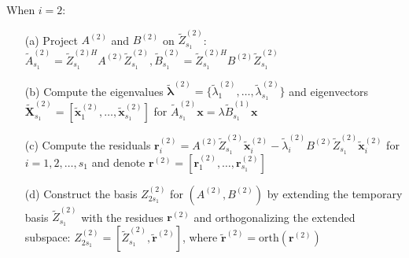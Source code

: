 \begin{algorithm}[H]
\begin{algorithmic}[1]
        \STATE When $i = 2$:
        \begin{itemize}
            \item[(a)] Project $A^{(2)}$ and $B^{(2)}$ on $\tilde{Z}_{s_{1}}^{(2)}$: 
            $\tilde{A}_{s_{1}}^{(2)} = \tilde{Z}_{s_{1}}^{(2)H}A^{(2)} \tilde{Z}_{s_{1}}^{(2)},  \tilde{B}_{s_{1}}^{(2)} = \tilde{Z}_{s_{1}}^{(2)H}B^{(2)}\tilde{Z}_{s_{1}}^{(2)}$

            \item[(b)] Compute the eigenvalues $\tilde{\boldsymbol{\lambda}}^{(2)} = \{\tilde{\lambda}_{1}^{(2)}, \dots, \tilde{\lambda}_{s_{1}}^{(2)}\}$ and eigenvectors $\tilde{\boldsymbol{X}}_{s_{1}}^{(2)} = \left[\tilde{\boldsymbol{x}}_{1}^{(2)}, \dots, \tilde{\boldsymbol{x}}_{s_{1}}^{(2)}\right]$ for $\tilde{A}_{s_{1}}^{(2)}\boldsymbol{x} = \lambda \tilde{B}_{s_{1}}^{(1)}\boldsymbol{x}$
            
            \item[(c)] Compute the residuals $\boldsymbol{r}_{i}^{(2)} = A^{(2)}\tilde{Z}_{s_{1}}^{(2)}\tilde{\boldsymbol{x}}_{i}^{(2)} - \tilde{\lambda}_{i}^{(2)}B^{(2)}\tilde{Z}_{s_{1}}^{(2)}\tilde{\boldsymbol{x}}_{i}^{(2)}$ for $i = 1, 2, \dots, s_{1}$ and denote $\boldsymbol{r}^{(2)} = \left[\boldsymbol{r}_{1}^{(2)}, \dots, \boldsymbol{r}_{s_{1}}^{(2)}\right]$
            
            \item[(d)] Construct the basis $Z_{2s_{1}}^{(2)}$ for $(A^{(2)}, B^{(2)})$ by extending the temporary basis $\tilde{Z}_{s_{1}}^{(2)}$ with the residues $\boldsymbol{r}^{(2)}$ and orthogonalizing the extended subspace: $Z_{2s_{1}}^{(2)} = \left[\tilde{Z}_{s_{1}}^{(2)}, \tilde{\boldsymbol{r}}^{(2)}\right]$, where $\tilde{\boldsymbol{r}}^{(2)} = \text{orth}\left(\boldsymbol{r}^{(2)}\right)$
            

\end{itemize}
\end{algorithmic}
\end{algorithm}
